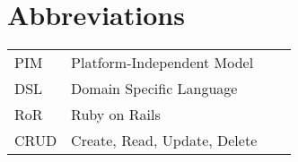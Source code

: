 \chapter*{Abbreviations}

\begin{flushleft}
\begin{tabular}{l p{0.8\linewidth}}
PIM       & Platform-Independent Model\\
DSL       & Domain Specific Language\\
RoR       & Ruby on Rails\\
CRUD      & Create, Read, Update, Delete
\end{tabular}
\end{flushleft}


